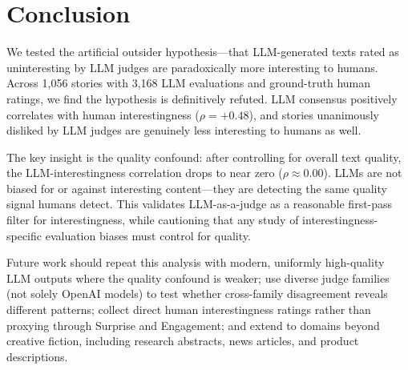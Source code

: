 \section{Conclusion}
\label{sec:conclusion}

We tested the artificial outsider hypothesis---that LLM-generated texts rated as uninteresting by LLM judges are paradoxically more interesting to humans.
Across 1,056 stories with 3,168 LLM evaluations and ground-truth human ratings, we find the hypothesis is definitively refuted.
LLM consensus positively correlates with human interestingness ($\rho = +0.48$), and stories unanimously disliked by LLM judges are genuinely less interesting to humans as well.

The key insight is the quality confound: after controlling for overall text quality, the LLM-interestingness correlation drops to near zero ($\rho \approx 0.00$).
LLMs are not biased for or against interesting content---they are detecting the same quality signal humans detect.
This validates LLM-as-a-judge as a reasonable first-pass filter for interestingness, while cautioning that any study of interestingness-specific evaluation biases must control for quality.

Future work should repeat this analysis with modern, uniformly high-quality LLM outputs where the quality confound is weaker; use diverse judge families (not solely OpenAI models) to test whether cross-family disagreement reveals different patterns; collect direct human interestingness ratings rather than proxying through Surprise and Engagement; and extend to domains beyond creative fiction, including research abstracts, news articles, and product descriptions.

